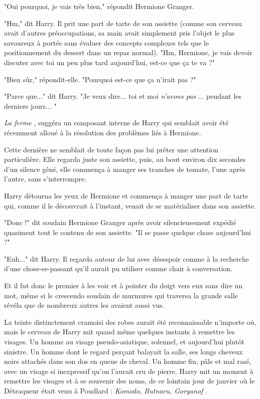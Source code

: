 "Oui pourquoi, je vais très bien," répondit Hermione Granger.

"Hm," dit Harry. Il prit une part de tarte de son assiette (comme son cerveau avait d'autres préoccupations, sa main avait simplement pris l'objet le plus savoureux à portée sans évaluer des concepts complexes tels que le positionnement du dessert dans un repas normal). "Hm, Hermione, je vais devoir discuter avec toi un peu plus tard aujourd'hui, est-ce que ça te va ?"

"Bien sûr," répondit-elle. "Pourquoi est-ce que ça n'irait pas ?"

"Parce que..." dit Harry. "Je veux dire... toi et moi \emph{n'avons pas} ... pendant les derniers jours... "

\emph{La ferme} , suggéra un composant interne de Harry qui semblait avoir été récemment alloué à la résolution des problèmes liés à Hermione.

Cette dernière ne semblait de toute façon pas lui prêter une attention particulière. Elle regarda juste son assiette, puis, au bout environ dix secondes d'un silence gêné, elle commença à manger ses tranches de tomate, l'une après l'autre, sans s'interrompre.

Harry détourna les yeux de Hermione et commença à manger une part de tarte qui, comme il le découvrait à l'instant, venait de se matérialiser dans son assiette.

"Donc !" dit soudain Hermione Granger après avoir silencieusement expédié quasiment tout le contenu de son assiette. "Il se passe quelque chose aujourd'hui ?"

"Euh..." dit Harry. Il regarda autour de lui avec désespoir comme à la recherche d'une chose-se-passant qu'il aurait pu utiliser comme chair à conversation.

Et il fut donc le premier à les voir et à pointer du doigt vers eux sans dire un mot, même si le crescendo soudain de murmures qui traversa la grande salle révéla que de nombreux autres les avaient aussi vus.

La teinte distinctement cramoisi des robes aurait été reconnaissable n'importe où, mais le cerveau de Harry mit quand même quelques instants à remettre les visages. Un homme au visage pseudo-asiatique, solennel, et aujourd'hui plutôt sinistre. Un homme dont le regard perçant balayait la salle, ses longs cheveux noirs attachés dans son dos en queue de cheval. Un homme fin, pâle et mal rasé, avec un visage si inexpressif qu'on l'aurait cru de pierre. Harry mit un moment à remettre les visages et à se souvenir des noms, de ce lointain jour de janvier où le Détraqueur était venu à Poudlard : \emph{Komodo, Butnaru, Goryanof} .

